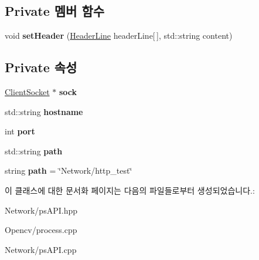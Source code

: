 \subsection*{Private 멤버 함수}
\begin{DoxyCompactItemize}
\item 
\mbox{\label{classps_1_1_a_p_i_a69fe88fa02cb98167b2307a71aedd934}} 
void {\bfseries set\+Header} (\hyperlink{struct_header_line}{Header\+Line} header\+Line\mbox{[}$\,$\mbox{]}, std\+::string content)
\end{DoxyCompactItemize}
\subsection*{Private 속성}
\begin{DoxyCompactItemize}
\item 
\mbox{\label{classps_1_1_a_p_i_a3c60874d96e8e725a1ba0369a05bd7ea}} 
\hyperlink{class_client_socket}{Client\+Socket} $\ast$ {\bfseries sock}
\item 
\mbox{\label{classps_1_1_a_p_i_a0d5f99f63a0697e0764f3ee9794a5c26}} 
std\+::string {\bfseries hostname}
\item 
\mbox{\label{classps_1_1_a_p_i_a58739732fd3c99f9725e5e1376bd5dd7}} 
int {\bfseries port}
\item 
\mbox{\label{classps_1_1_a_p_i_ae93da803b67097f16a009d7acf78d957}} 
std\+::string {\bfseries path}
\item 
\mbox{\label{classps_1_1_a_p_i_a592e8c7a71b12ae09e28588b4b687fe9}} 
string {\bfseries path} = \char`\"{}Network/http\+\_\+test\char`\"{}
\end{DoxyCompactItemize}


이 클래스에 대한 문서화 페이지는 다음의 파일들로부터 생성되었습니다.\+:\begin{DoxyCompactItemize}
\item 
Network/ps\+A\+P\+I.\+hpp\item 
Opencv/process.\+cpp\item 
Network/ps\+A\+P\+I.\+cpp\end{DoxyCompactItemize}
